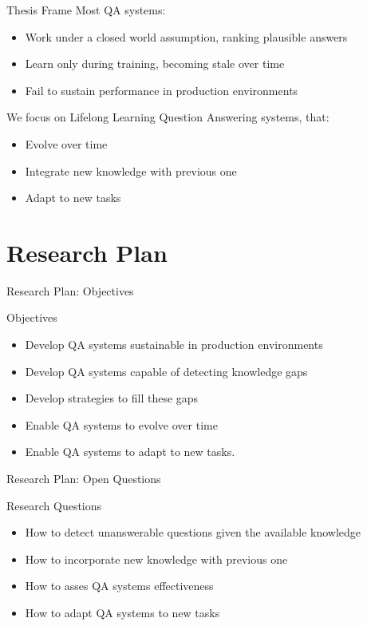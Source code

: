 \documentclass{beamer}
\begin{document}
\begin{frame}{Thesis Frame}
  Most QA systems:
  \begin{itemize}
    \item Work under a closed world assumption, ranking plausible answers
    \item Learn only during training, becoming stale over time
    \item Fail to sustain performance in production environments
  \end{itemize}
  We focus on Lifelong Learning Question Answering systems, that:
  \begin{itemize}
    \item Evolve over time
    \item Integrate new knowledge with previous one
    \item Adapt to new tasks
  \end{itemize}
\end{frame}

\section{Research Plan}
\begin{frame}{Research Plan: Objectives}
  \begin{alertblock}{Objectives}
    \begin{itemize}
      \item Develop QA systems sustainable in production environments
      \item Develop QA systems capable of detecting knowledge gaps
      \item Develop strategies to fill these gaps
      \item Enable QA systems to evolve over time
      \item Enable QA systems to adapt to new tasks.
    \end{itemize}
  \end{alertblock}
\end{frame}


\begin{frame}{Research Plan: Open Questions}
  \begin{alertblock}{Research Questions}
    \begin{itemize}
      \item How to detect unanswerable questions given the available knowledge
      \item How to incorporate new knowledge with previous one
      \item How to asses QA systems effectiveness
      \item How to adapt QA systems to new tasks
    \end{itemize}
  \end{alertblock}
\end{frame}
\end{document}
